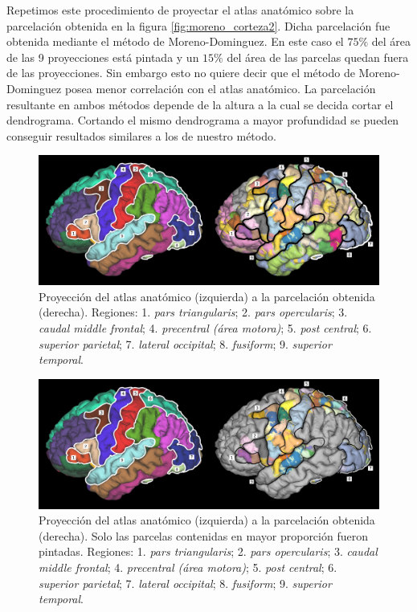 Repetimos este procedimiento de proyectar el atlas anat\'omico sobre la
parcelaci\'on obtenida en la figura \ref{fig:moreno_corteza2}. Dicha
parcelaci\'on fue obtenida mediante el m\'etodo de Moreno-Dominguez.
En este caso el $75\%$ del \'area de las 9 proyecciones est\'a pintada y 
un $15\%$ del \'area de las parcelas quedan fuera de las proyecciones. 
Sin embargo esto no quiere decir que el m\'etodo de Moreno-Dominguez 
posea menor correlaci\'on con el atlas anat\'omico. La parcelaci\'on 
resultante en ambos m\'etodos depende de la altura a la cual se decida 
cortar el dendrograma. Cortando el mismo dendrograma a mayor profundidad
se pueden conseguir resultados similares a los de nuestro m\'etodo.\\

\begin{figure}[h!]
    \includegraphics[width=\textwidth]{img/anatomica2parcelation.png}
    \caption{Proyecci\'on del atlas anat\'omico (izquierda) a la 
             parcelaci\'on obtenida (derecha). Regiones: 
             1. \textit{pars triangularis}; 2. \textit{pars opercularis};
             3. \textit{caudal middle frontal}; 
             4. \textit{precentral (\'area motora)}; 
             5. \textit{post central}; 6. \textit{superior parietal}; 
             7. \textit{lateral occipital}; 8. \textit{fusiform};
             9. \textit{superior temporal}.  }
    \label{fig:an2pa}
\end{figure}

\begin{figure}[h!]
    \includegraphics[width=\textwidth]{img/anatomica2parcelation2.png}
    \caption{Proyecci\'on del atlas anat\'omico (izquierda) a la 
             parcelaci\'on obtenida (derecha). Solo las parcelas contenidas
             en mayor proporci\'on fueron pintadas. Regiones: 
             1. \textit{pars triangularis}; 2. \textit{pars opercularis};
             3. \textit{caudal middle frontal}; 
             4. \textit{precentral (\'area motora)}; 
             5. \textit{post central}; 6. \textit{superior parietal}; 
             7. \textit{lateral occipital}; 8. \textit{fusiform};
             9. \textit{superior temporal}.  }
    \label{fig:an2pa2}
\end{figure}


